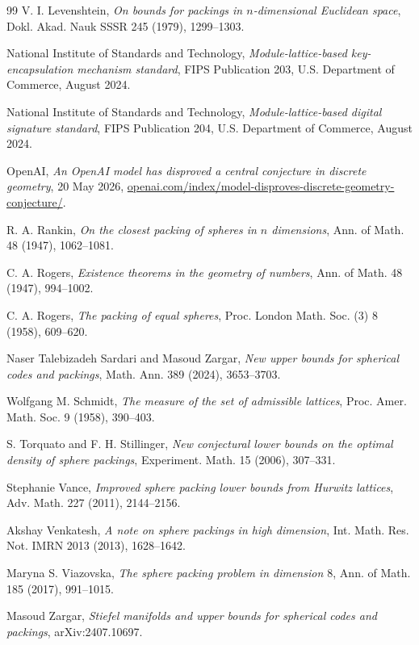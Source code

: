 \documentclass[11pt]{article}
\theoremstyle{remark}
\begin{document}
\begin{thebibliography}{99}
V. I. Levenshtein,
\emph{On bounds for packings in $n$-dimensional Euclidean space},
Dokl. Akad. Nauk SSSR 245 (1979), 1299--1303.

National Institute of Standards and Technology,
\emph{Module-lattice-based key-encapsulation mechanism standard},
FIPS Publication 203, U.S. Department of Commerce, August 2024.

National Institute of Standards and Technology,
\emph{Module-lattice-based digital signature standard},
FIPS Publication 204, U.S. Department of Commerce, August 2024.

OpenAI,
\emph{An OpenAI model has disproved a central conjecture in discrete geometry},
20 May 2026,
\href{https://openai.com/index/model-disproves-discrete-geometry-conjecture/}
{openai.com/index/model-disproves-discrete-geometry-conjecture/}.

R. A. Rankin,
\emph{On the closest packing of spheres in $n$ dimensions},
Ann. of Math. 48 (1947), 1062--1081.

C. A. Rogers,
\emph{Existence theorems in the geometry of numbers},
Ann. of Math. 48 (1947), 994--1002.

C. A. Rogers,
\emph{The packing of equal spheres},
Proc. London Math. Soc. (3) 8 (1958), 609--620.

Naser Talebizadeh Sardari and Masoud Zargar,
\emph{New upper bounds for spherical codes and packings},
Math. Ann. 389 (2024), 3653--3703.

Wolfgang M. Schmidt,
\emph{The measure of the set of admissible lattices},
Proc. Amer. Math. Soc. 9 (1958), 390--403.

S. Torquato and F. H. Stillinger,
\emph{New conjectural lower bounds on the optimal density of sphere packings},
Experiment. Math. 15 (2006), 307--331.

Stephanie Vance,
\emph{Improved sphere packing lower bounds from Hurwitz lattices},
Adv. Math. 227 (2011), 2144--2156.

Akshay Venkatesh,
\emph{A note on sphere packings in high dimension},
Int. Math. Res. Not. IMRN 2013 (2013), 1628--1642.

Maryna S. Viazovska,
\emph{The sphere packing problem in dimension $8$},
Ann. of Math. 185 (2017), 991--1015.

Masoud Zargar,
\emph{Stiefel manifolds and upper bounds for spherical codes and packings},
arXiv:2407.10697.

\end{thebibliography}
\end{document}
